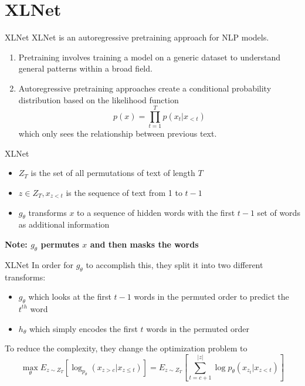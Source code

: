 \documentclass[14pt,aspectratio=169]{beamer}
\newcommand{\XL}{XLNet}
\begin{document}
\section{\XL}
\begin{frame}{\XL}
    XLNet is an autoregressive pretraining approach for NLP models.
    \begin{enumerate}
        \item Pretraining involves training a model on a generic dataset to understand general patterns within a broad field. \\
        \item Autoregressive pretraining approaches create a conditional probability distribution based on the likelihood function \begin{equation*}
            p(x)=\prod_{t=1}^{T}p(x_{t}|x_{<t})
        \end{equation*} which only sees the relationship between previous text.
    \end{enumerate}
\end{frame}

\begin{frame}{\XL}
     \begin{itemize}
        \item $Z_{T}$ is the set of all permutations of text of length $T$ \\
        \item $z\in Z_{T}, x_{z<t}$ is the sequence of text from 1 to $t−1$ \\
        \item $g_{\theta}$ transforms $x$ to a sequence of hidden words with the first $t-1$ set of words as additional information
    \end{itemize}
    \textbf{Note: $g_{\theta}$ permutes $x$ and then masks the words}
\end{frame}

\begin{frame}{\XL}
    In order for $g_{\theta}$ to accomplish this, they split it into two different transforms: 
    \begin{itemize}
        \item $g_{\theta}$ which looks at the first $t-1$ words in the permuted order to predict the  $t^{th}$ word \\
        \item $h_{\theta}$ which simply encodes the first $t$ words in the permuted order
    \end{itemize}
    To reduce the complexity, they change the optimization problem to \begin{equation*}
        \max_{\theta}E_{z\sim Z_{T}}\left[\log_{p_{\theta}}(x_{z>c}|x_{z\leq t})\right]=E_{z\sim Z_{T}}\left[\sum_{t=c+1}^{|z|}\log p_{\theta}(x_{z_{t}}|x_{z<t})\right]
    \end{equation*}
\end{frame}
\end{document}
